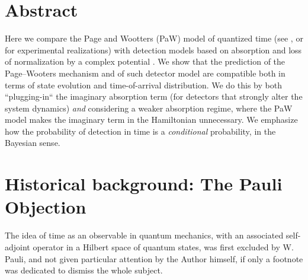 \documentclass[a0,portrait]{a0poster}
\begin{document}
\begin{multicols}{2} %


\color{Navy} %

\section*{\large Abstract}
Here we compare the Page and Wootters (PaW) model of quantized time
(see \cite{PageWootters, Lloyd:Time},
or \cite{Moreva:illustration, Moreva_position} for experimental realizations)
with detection models based on absorption and loss of normalization
by a complex potential \cite{RuschhauptAbsorption}. We show that the prediction
of the Page--Wooters mechanism and of such detector model are compatible both in terms
of state evolution and time-of-arrival distribution. We do this by both ``plugging-in``
the imaginary absorption term (for detectors that strongly alter the system dynamics)
\emph{and} considering a weaker absorption regime, where the PaW model makes
the imaginary term in the Hamiltonian unnecessary. We emphasize how the probability
of detection in time is a \emph{conditional}
probability, in the Bayesian \cite{Maccone:QMOT} sense.



\setlength{\parindent}{1.5em} %


\color{SaddleBrown} %

\large

\section*{Historical background: The Pauli Objection}
The idea of time as an observable in quantum mechanics,
with an associated self-adjoint operator in a Hilbert space of quantum states,
was first excluded by W. Pauli,
and not given particular attention by the Author himself,
if only a footnote was dedicated to dismiss the whole subject. \cite{PauliFootnote}


\end{multicols}
\end{document}
